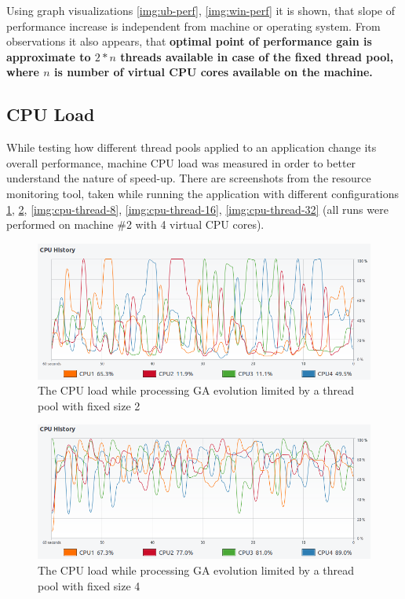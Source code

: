 Using graph visualizations \ref{img:ub-perf}, \ref{img:win-perf} it is shown, that slope of performance increase is independent from machine or operating system. From observations it also appears, that \textbf{optimal point of performance gain is approximate to \( 2 * n\) threads available in case of the fixed thread pool, where \(n\) is number of virtual CPU cores available on the machine.}

\subsection{CPU Load}

While testing how different thread pools applied to an application change its overall performance, machine CPU load was measured in order to better understand the nature of speed-up. There are screenshots from the resource monitoring tool, taken while running the application with different configurations \ref{img:cpu-thread-2}, \ref{img:cpu-thread-4}, \ref{img:cpu-thread-8}, \ref{img:cpu-thread-16}, \ref{img:cpu-thread-32} (all runs were performed on machine \#2 with 4 virtual CPU cores).

\begin{figure}[t]
\centering\includegraphics[width=\textwidth]{img/exp/2/limit-threadpool-2}
\caption{The CPU load while processing GA evolution limited by a thread pool with fixed size 2 }  \label{img:cpu-thread-2}
\end{figure}

\begin{figure}[t]
\centering\includegraphics[width=\textwidth]{img/exp/2/limit-threadpool-4}
\caption{The CPU load while processing GA evolution limited by a thread pool with fixed size 4 }  \label{img:cpu-thread-4}
\end{figure}

